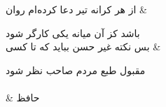 \begin{center}
	\begin{minipage}{\textwidth}
		\begin{traditionalpoem}
			از هر کرانه تیر دعا کرده‌ام روان 		  & 
			
			باشد کز آن میانه یکی کارگر شود 	 \\
			
			بس نکته غیر حسن بباید که تا کسی	    	  &
			
			مقبول طبع مردم صاحب نظر شود  \\
			\\
			& 
			\hspace{45pt}
			حافظ
		\end{traditionalpoem}
	\end{minipage}
\end{center}





